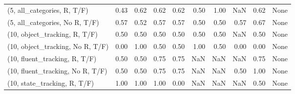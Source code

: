\begin{table*}[h!]
\begin{adjustbox}{width=2\columnwidth,center}
\begin{tabular}{lrrr|rrr|rrr}
(5, all\_categories, R, T/F)          &                      0.43 &                  0.62 &                      0.62 &                          0.62 &                      0.50 &                          1.00 &                                    NaN &                               0.62 &                                  None \\
(5, all\_categories, No R, T/F)       &                      0.57 &                  0.52 &                      0.57 &                          0.57 &                      0.50 &                          0.50 &                                   0.57 &                               0.67 &                                  None \\



\midrule
(10, object\_tracking, R, T/F)         &                      0.50 &                  0.50 &                      0.50 &                          0.50 &                      0.50 &                          0.50 &                                    NaN &                               0.50 &                                  None \\
(10, object\_tracking, No R, T/F)      &                      0.00 &                  1.00 &                      0.50 &                          0.50 &                      1.00 &                          0.50 &                                   0.00 &                               0.00 &                                  None \\
(10, fluent\_tracking, R, T/F)         &                      0.50 &                  0.50 &                      0.75 &                          0.75 &                       NaN &                           NaN &                                    NaN &                               0.75 &                                  None \\
(10, fluent\_tracking, No R, T/F)      &                      0.50 &                  0.50 &                      0.75 &                          0.75 &                       NaN &                           NaN &                                   0.50 &                               1.00 &                                  None \\
(10, state\_tracking, R, T/F)          &                      1.00 &                  1.00 &                      1.00 &                          0.00 &                       NaN &                           NaN &                                    NaN &                               0.50 &                                  None \\

\end{tabular}
\end{adjustbox}
\end{table*}
